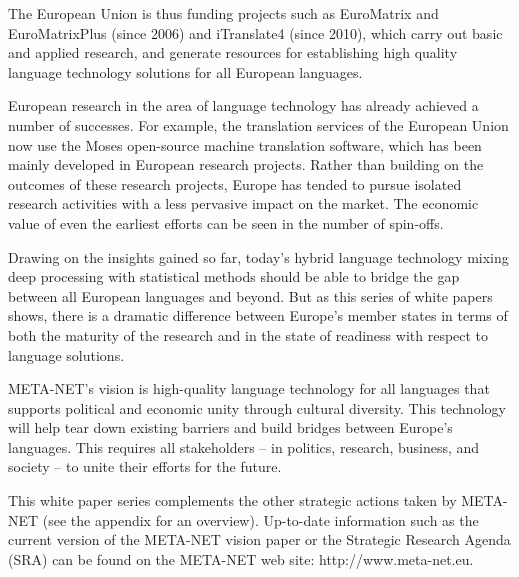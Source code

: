 \begin{multicols}{2}
The European Union is thus funding projects such as EuroMatrix and EuroMatrixPlus (since 2006) and iTranslate4 (since 2010), which carry out basic and applied research, and generate resources for establishing high quality language technology solutions for all European languages. 

European research in the area of language technology has already achieved a number of successes. For example, the translation services of the European Union now use the Moses open-source machine translation software, which has been mainly developed in European research projects. Rather than building on the outcomes of these research projects, Europe has tended to pursue isolated research activities with a less pervasive impact on the market. The economic value of even the earliest efforts can be seen in the number of spin-offs. 


Drawing on the insights gained so far, today’s hybrid language technology mixing deep processing with statistical methods should be able to bridge the gap between all European languages and beyond. But as this series of white papers shows, there is a dramatic difference between Europe's member states in terms of both the maturity of the research and in the state of readiness with respect to language solutions.  

META-NET’s vision is high-quality language technology for all languages that supports political and economic unity through cultural diversity. This technology will help tear down existing barriers and build bridges between Europe’s languages. This requires all stakeholders -- in politics, research, business, and society -- to unite their efforts for the future.

This white paper series complements the other strategic actions taken by META-NET (see the appendix for an overview). Up-to-date information such as the current version of the META-NET vision paper \cite{Meta1} or the Strategic Research Agenda (SRA) can be found on the META-NET web site: http://www.meta-net.eu.
\end{multicols}

\clearpage



